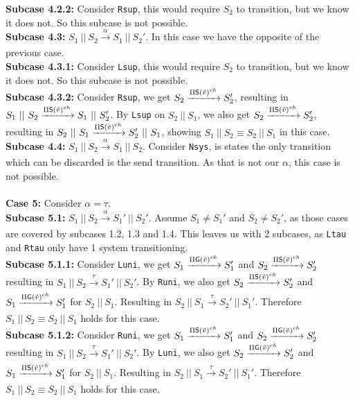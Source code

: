 \indent \indent \textbf{Subcase 4.2.2: } Consider \texttt{Rsup}, this would require $S_2$ to transition, but we know it does not. So this subcase is not possible.\\
\indent \textbf{Subcase 4.3: }$S_1 \ || \ S_2 \xrightarrow[]{\alpha} S_1 \ || \ S_2'$. In this case we have the opposite of the previous case.\\
\indent \indent \textbf{Subcase 4.3.1: } Consider \texttt{Lsup}, this would require $S_2$ to transition, but we know it does not. So this subcase is not possible.\\
\indent \indent \textbf{Subcase 4.3.2: } Consider \texttt{Rsup}, we get $S_2 \xrightarrow[]{\Pi \mathsf{S}(\Tilde{v})^{ch}} S_2'$, resulting in $S_1 \ || \ S_2 \xrightarrow[]{\Pi \mathsf{S}(\Tilde{v})^{ch}} S_1 \ || \ S_2'$. By \texttt{Lsup} on $S_2\ ||\ S_1$, we also get $S_2 \xrightarrow[]{\Pi \mathsf{S}(\Tilde{v})^{ch}} S_2'$, resulting in $S_2 \ || \ S_1 \xrightarrow[]{\Pi \mathsf{S}(\Tilde{v})^{ch}} S_2' \ || \ S_1$, showing $S_1 \ || \ S_2 \equiv S_2\ ||\ S_1$ in this case.\\
\indent \textbf{Subcase 4.4:} $S_1 \ || \ S_2 \xrightarrow[]{\alpha} S_1 \ || \ S_2$. Consider \texttt{Nsys}, is states the only transition which can be discarded is the send transition. As that is not our $\alpha$, this case is not possible.\\
\\
\textbf{Case 5: } Consider $\alpha = \tau$.\\
\indent \textbf{Subcase 5.1: }$S_1 \ || \ S_2 \xrightarrow[]{\alpha} S_1' \ || \ S_2'$. Assume $S_1\not= S_1'$ and $S_2\not= S_2'$, as those cases are covered by subcases 1.2, 1.3 and 1.4. This leaves us with 2 subcases, as \texttt{Ltau} and \texttt{Rtau} only have 1 system transitioning.\\
\indent \indent \textbf{Subcase 5.1.1: } Consider \texttt{Luni}, we get $S_1 \xrightarrow[]{\Pi \mathsf{G}(\Tilde{v})^{ch}} S_1'$ and $S_2 \xrightarrow[]{\Pi \mathsf{S}(\Tilde{v})^{ch}} S_2'$ resulting in $S_1 \ || \ S_2 \xrightarrow[]{\tau} S_1' \ || \ S_2'$. By \texttt{Runi}, we also get $S_2 \xrightarrow[]{\Pi \mathsf{S}(\Tilde{v})^{ch}} S_2'$ and $S_1 \xrightarrow[]{\Pi \mathsf{G}(\Tilde{v})^{ch}} S_1'$ for $S_2\ ||\ S_1$. Resulting in $S_2 \ || \ S_1 \xrightarrow[]{\tau} S_2' \ || \ S_1'$. Therefore $S_1 \ || \ S_2 \equiv S_2\ ||\ S_1$ holds for this case.\\
\indent \indent \textbf{Subcase 5.1.2: } Consider \texttt{Runi}, we get $S_1 \xrightarrow[]{\Pi \mathsf{S}(\Tilde{v})^{ch}} S_1'$ and $S_2 \xrightarrow[]{\Pi \mathsf{G}(\Tilde{v})^{ch}} S_2'$ resulting in $S_1 \ || \ S_2 \xrightarrow[]{\tau} S_1' \ || \ S_2'$. By \texttt{Luni}, we also get $S_2 \xrightarrow[]{\Pi \mathsf{G}(\Tilde{v})^{ch}} S_2'$ and $S_1 \xrightarrow[]{\Pi \mathsf{S}(\Tilde{v})^{ch}} S_1'$ for $S_2\ ||\ S_1$. Resulting in $S_2 \ || \ S_1 \xrightarrow[]{\tau} S_2' \ || \ S_1'$. Therefore $S_1 \ || \ S_2 \equiv S_2\ ||\ S_1$ holds for this case.\\

